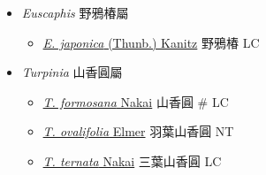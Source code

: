 
  \begin{itemize}
 \item[] \textit{Euscaphis} 野鴉椿屬
                                
  \begin{itemize}
        \item[] \href{http://www.theplantlist.org/tpl1.1/search?q=Euscaphis+japonica}{\textit{E. japonica} (Thunb.) Kanitz}   野鴉椿   LC
  \end{itemize}
 \item[] \textit{Turpinia} 山香圓屬
                                
  \begin{itemize}
        \item[] \href{http://www.theplantlist.org/tpl1.1/search?q=Turpinia+formosana}{\textit{T. formosana} Nakai}   山香圓  \# LC
        \item[] \href{http://www.theplantlist.org/tpl1.1/search?q=Turpinia+ovalifolia}{\textit{T. ovalifolia} Elmer}   羽葉山香圓   NT
        \item[] \href{http://www.theplantlist.org/tpl1.1/search?q=Turpinia+ternata}{\textit{T. ternata} Nakai}   三葉山香圓   LC
  \end{itemize}
  \end{itemize}
